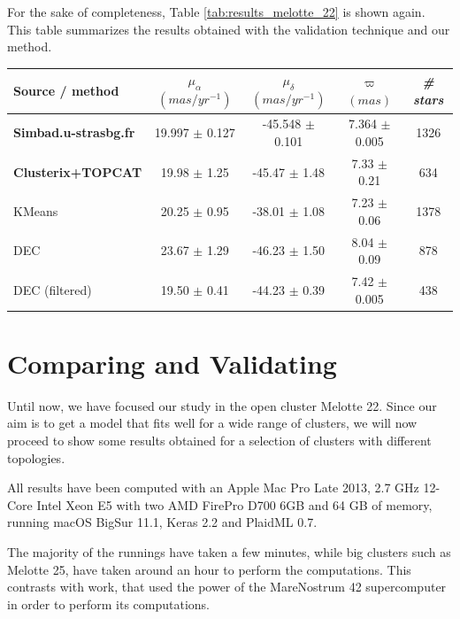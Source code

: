 \documentclass[11pt, a4paper, english]{book}
\begin{document}
For the sake of completeness, Table \ref{tab:results_melotte_22} is shown again.
This table summarizes the results obtained with the validation technique and our method.

\begin{table}[h!]
  \begin{center}
    \begin{tabular}{l|c|c|c|c}
      \textbf{Source / method} & \emph{$\mu_{\alpha}$ $(mas/yr^{-1})$} & \emph{$\mu_{\delta}$ $(mas/yr^{-1})$} & \emph{$\varpi$ $(mas)$} & \emph{\# stars} \\
      \hline
      \textbf{Simbad.u-strasbg.fr} & 19.997 $\pm$ 0.127 & -45.548 $\pm$ 0.101 & 7.364 $\pm$ 0.005 & 1326 \\
      \textbf{Clusterix+TOPCAT} & 19.98 $\pm$ 1.25 & -45.47 $\pm$ 1.48 & 7.33 $\pm$ 0.21 & 634 \\
      KMeans & 20.25 $\pm$ 0.95 & -38.01 $\pm$ 1.08 & 7.23 $\pm$ 0.06 & 1378 \\
      DEC & 23.67 $\pm$ 1.29 & -46.23 $\pm$ 1.50 & 8.04 $\pm$ 0.09 & 878 \\
      DEC (filtered) & 19.50 $\pm$ 0.41 & -44.23 $\pm$ 0.39 & 7.42 $\pm$ 0.005 & 438 \\
    \end{tabular}
  \end{center}
\end{table}

\section{Comparing and Validating}
\label{sec:comparing_and_validating}

Until now, we have focused our study in the open cluster Melotte 22.
Since our aim is to get a model that fits well for a wide range of clusters,
we will now proceed to show some results obtained for a selection of clusters with different topologies.

All results have been computed with an Apple Mac Pro Late 2013,
2.7 GHz 12-Core Intel Xeon E5 with two AMD FirePro D700 6GB and 64 GB
of memory, running macOS BigSur 11.1, Keras 2.2 and PlaidML 0.7.

The majority of the runnings have taken a few minutes, while big clusters such as Melotte 25,
have taken around an hour to perform the computations.
This contrasts with  work,
that used the power of the MareNostrum 42 supercomputer in order to perform its computations.
\end{document}
